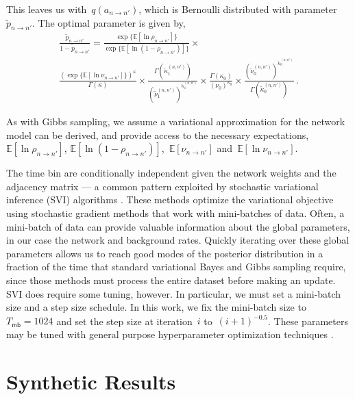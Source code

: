 This leaves us with~$q(a_{n \to n'})$, which is Bernoulli distributed
with parameter~$\widetilde{p}_{n \to n'}$. The optimal parameter is given by,
\begin{multline*}
  \frac{\widetilde{p}_{n \to n'}}{1-\widetilde{p}_{n \to n'}} =  
  \frac{\exp\{\mathbb{E} [\ln \rho_{n \to n'}] \} }{\exp\{\mathbb{E}[\ln (1-\rho_{n \to n'})] \}} \times \\
  \frac{ (\exp\{\mathbb{E} [\ln \nu_{n \to n'}] \})^{\kappa} }{ \Gamma(\kappa)} \times 
  \frac{\Gamma(\widetilde{\kappa}^{(n,n')}_1)}{ (\widetilde{\nu}^{(n,n')}_1)^{\widetilde{\kappa}^{(n,n')}_1} } \times
  \frac{\Gamma(\kappa_0)}{ (\nu_0)^{\kappa_0} } \times
  \frac{(\widetilde{\nu}^{(n,n')}_0)^{\widetilde{\kappa}^{(n,n')}_0}}{ \Gamma(\widetilde{\kappa}^{(n,n')}_0)}\,.
\end{multline*}

As with Gibbs sampling, we assume a variational approximation for the
network model can be derived, and provide access to the necessary
expectations,~$\mathbb{E}[\ln \rho_{n \to n'}]$,
$\mathbb{E}[\ln(1-\rho_{n \to n'})]$,~$\mathbb{E}[\nu_{n \to n'}]$ and~$\mathbb{E}[\ln \nu_{n \to n'}]$.

The time bin are conditionally independent given
the network weights and the adjacency matrix --- a common pattern
exploited by stochastic variational inference (SVI) algorithms
\citep{Hoffman-2013}.  These methods optimize the variational objective
using stochastic gradient methods that work with mini-batches of data.
Often, a mini-batch of data can provide valuable information about the
global parameters, in our case the network and background rates.
Quickly iterating over these global parameters allows us to reach good
modes of the posterior distribution in a fraction of the time that
standard variational Bayes and Gibbs sampling require, since those
methods must process the entire dataset before making an update.  SVI
does require some tuning, however. In particular, we must set a
mini-batch size and a step size schedule.  In this work, we fix the
mini-batch size to~${T_{\mathsf{mb}}=1024}$ and set the step size at
iteration~$i$ to~${(i+1)^{-0.5}}$.  These parameters may be tuned with
general purpose hyperparameter optimization techniques
\citep{Snoek-2012}.

\section{Synthetic Results}

